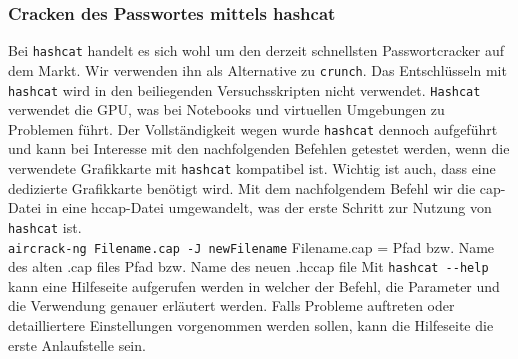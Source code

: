 	\subsubsection{Cracken des Passwortes mittels hashcat}
	Bei \colorbox{altgray}{\lstinline|hashcat|} handelt es sich wohl um den derzeit schnellsten Passwortcracker auf dem Markt. Wir verwenden ihn als Alternative zu \colorbox{altgray}{\lstinline|crunch|}. Das Entschlüsseln mit \colorbox{altgray}{\lstinline|hashcat|} wird in den beiliegenden Versuchsskripten nicht verwendet. \colorbox{altgray}{\lstinline|Hashcat|} verwendet die GPU, was bei Notebooks und virtuellen Umgebungen zu Problemen führt. Der Vollständigkeit wegen wurde \colorbox{altgray}{\lstinline|hashcat|} dennoch aufgeführt und kann bei Interesse mit den nachfolgenden Befehlen getestet werden, wenn die verwendete Grafikkarte mit \colorbox{altgray}{\lstinline|hashcat|} kompatibel ist. Wichtig ist auch, dass eine dedizierte Grafikkarte benötigt wird. Mit dem nachfolgendem Befehl wir die cap-Datei in eine hccap-Datei umgewandelt, was der erste Schritt zur Nutzung von \colorbox{altgray}{\lstinline|hashcat|} ist.\newline
	\\
	\colorbox{altgray}{\lstinline|aircrack-ng Filename.cap -J newFilename|}\newline
	Filename.cap = Pfad bzw. Name des alten .cap files\newline
	Pfad bzw. Name des neuen .hccap file\newline\newline
	Mit \colorbox{altgray}{\lstinline|hashcat --help|} kann eine Hilfeseite aufgerufen werden in welcher der Befehl, die Parameter und die Verwendung genauer erläutert werden. Falls Probleme auftreten oder detailliertere Einstellungen vorgenommen werden sollen, kann die Hilfeseite die erste Anlaufstelle sein.
